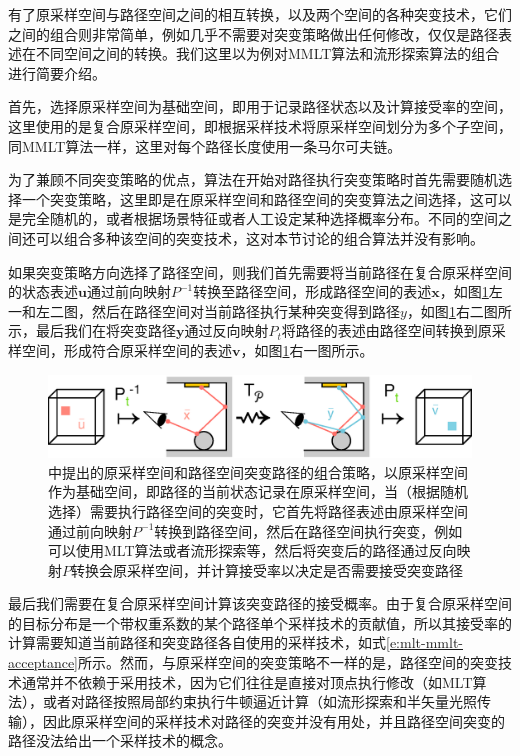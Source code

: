 有了原采样空间与路径空间之间的相互转换，以及两个空间的各种突变技术，它们之间的组合则非常简单，例如几乎不需要对突变策略做出任何修改，仅仅是路径表述在不同空间之间的转换。我们这里以\cite{a:FusingStateSpacesforMarkovChainMonteCarloRendering}为例对MMLT算法和流形探索算法的组合进行简要介绍。

首先，选择原采样空间为基础空间，即用于记录路径状态以及计算接受率的空间，这里使用的是复合原采样空间，即根据采样技术将原采样空间划分为多个子空间，同MMLT算法一样，这里对每个路径长度使用一条马尔可夫链。

为了兼顾不同突变策略的优点，算法在开始对路径执行突变策略时首先需要随机选择一个突变策略，这里即是在原采样空间和路径空间的突变算法之间选择，这可以是完全随机的，或者根据场景特征或者人工设定某种选择概率分布。不同的空间之间还可以组合多种该空间的突变技术，这对本节讨论的组合算法并没有影响。

如果突变策略方向选择了路径空间，则我们首先需要将当前路径在复合原采样空间的状态表述${\mathbf{u}}$通过前向映射$P^{-1}$转换至路径空间，形成路径空间的表述${\mathbf{x}}$，如图\ref{f:mlt-fusing}左一和左二图，然后在路径空间对当前路径执行某种突变得到路径${y}$，如图\ref{f:mlt-fusing}右二图所示，最后我们在将突变路径${\mathbf{y}}$通过反向映射$P_t$将路径的表述由路径空间转换到原采样空间，形成符合原采样空间的表述${\mathbf{v}}$，如图\ref{f:mlt-fusing}右一图所示。

\begin{figure}
	\includegraphics[width=1.0\textwidth]{figures/mlt/fusing}
	\caption{\cite{a:FusingStateSpacesforMarkovChainMonteCarloRendering}中提出的原采样空间和路径空间突变路径的组合策略，以原采样空间作为基础空间，即路径的当前状态记录在原采样空间，当（根据随机选择）需要执行路径空间的突变时，它首先将路径表述由原采样空间通过前向映射$P^{-1}$转换到路径空间，然后在路径空间执行突变，例如可以使用MLT算法或者流形探索等，然后将突变后的路径通过反向映射$P$转换会原采样空间，并计算接受率以决定是否需要接受突变路径}
	\label{f:mlt-fusing}
\end{figure}

最后我们需要在复合原采样空间计算该突变路径的接受概率。由于复合原采样空间的目标分布是一个带权重系数的某个路径单个采样技术的贡献值，所以其接受率的计算需要知道当前路径和突变路径各自使用的采样技术，如式\ref{e:mlt-mmlt-acceptance}所示。然而，与原采样空间的突变策略不一样的是，路径空间的突变技术通常并不依赖于采用技术，因为它们往往是直接对顶点执行修改（如MLT算法），或者对路径按照局部约束执行牛顿逼近计算（如流形探索和半矢量光照传输），因此原采样空间的采样技术对路径的突变并没有用处，并且路径空间突变的路径没法给出一个采样技术的概念。

